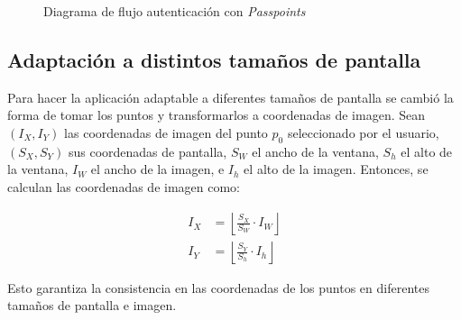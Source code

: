 \begin{figure}[H]
\begin{minipage}[b]{0.42\linewidth}
		\caption{Diagrama de flujo autenticación con \textit{Passpoints}}
		\label{flujo_registro}
	\end{minipage}
		
\end{figure}


\subsection{Adaptaci\'on a distintos tama\~nos de pantalla}
Para hacer la aplicaci\'on adaptable a diferentes tama\~nos de pantalla se cambi\'o la forma de tomar los puntos y transformarlos a coordenadas de imagen.
Sean $(I_X, I_Y)$ las coordenadas de imagen del punto $p_0$ seleccionado por el usuario, $(S_X, S_Y)$ sus coordenadas de pantalla, $S_W$ el ancho de la ventana, $S_h$ el alto de la ventana, $I_W$ el ancho de la imagen, e $I_h$ el alto de la imagen. Entonces, se calculan las coordenadas de imagen como:

\begin{align*}
	I_X &= \left\lfloor \frac{S_X}{S_W} \cdot I_W \right\rfloor \\
	I_Y &= \left\lfloor \frac{S_Y}{S_h} \cdot I_h \right\rfloor
\end{align*}

Esto garantiza la consistencia en las coordenadas de los puntos en diferentes tamaños de pantalla e imagen.


